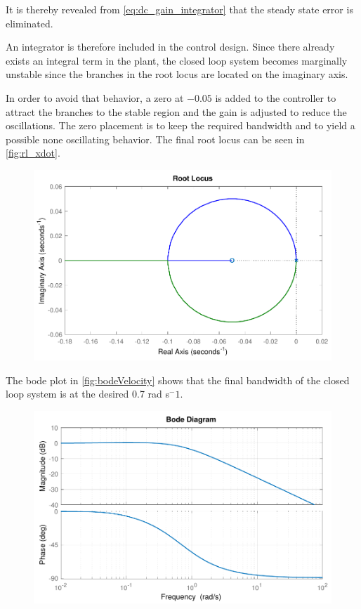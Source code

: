 It is thereby revealed from \autoref{eq:dc_gain_integrator} that the steady state error is eliminated. 

An integrator is therefore included in the control design. Since there already exists an integral term in the plant, the closed loop system becomes marginally unstable since the branches in the root locus are located on the imaginary axis.

In order to avoid that behavior, a zero at $-0.05$ is added to the controller to attract the branches to the stable region and the gain is adjusted to reduce the oscillations. The zero placement is to keep the required bandwidth and to yield a possible none oscillating behavior. The final root locus can be seen in \autoref{fig:rl_xdot}.
%
\begin{figure}[H]
	\includegraphics[scale=.7]{figures/rl_xdot}
	\centering			
	\label{fig:rl_xdot}
\end{figure}
%
The bode plot in \autoref{fig:bodeVelocity} shows that the final bandwidth of the closed loop system is at the desired 0.7 rad s$^-1$.
%
\begin{figure}[H]
	\includegraphics[scale=.8]{figures/bodeVelocity}
	\centering			
	\label{fig:bodeVelocity}
\end{figure}

